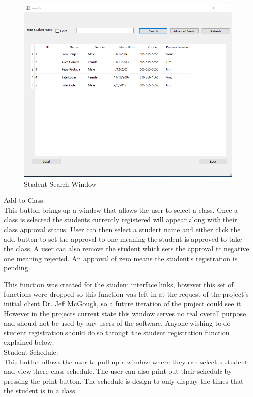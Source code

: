 \begin{figure}
  \includegraphics[width=\linewidth]{pics/userGuide/searchStudents.png}
  \caption{Student Search Window}
  \label{fig:User doc: Student Search}
\end{figure}

Add to Class:\\
This button brings up a window that allows the user to select a class. Once a class is selected the students currently registered will appear along with their class approval status. User can then select a student name and either click the add button to set the approval to one meaning the student is approved to take the class. A user can also remove the student which sets the approval to negative one meaning rejected. An approval of zero means the student's registration is pending.

This function was created for the student interface links, however this set of functions were dropped so this function was left in at the request of the project's initial client Dr. Jeff McGough, so a future iteration of the project could see it. However in the projects current state this window serves no real overall purpose and should not be used by any users of the software. Anyone wishing to do student registration should do so through the student registration function explained below.\\

Student Schedule:\\
This button allows the user to pull up a window where they can select a student and view there class schedule. The user can also print out their schedule by pressing the print button. The schedule is design to only display the times that the student is in a class.\\

